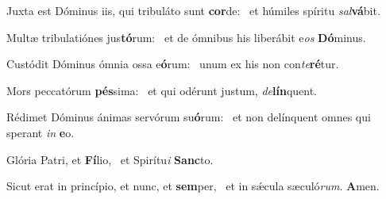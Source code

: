 \item Juxta est Dóminus iis, qui tribuláto sunt \textbf{cor}de:~\psstar{} et húmiles spíritu \textit{sal}\textbf{vá}bit.
\item Multæ tribulatiónes jus\textbf{tó}\-rum:~\psstar{} et de ómnibus his liberábit e\textit{os} \textbf{Dó}minus.
\item Custódit Dóminus ómnia ossa e\textbf{ó}rum:~\psstar{} unum ex his non con\textit{te}\textbf{ré}tur.
\item Mors peccatórum \textbf{pés}sima:~\psstar{} et qui odérunt justum, \textit{de}\textbf{lín}quent.
\item Rédimet Dóminus ánimas servórum su\textbf{ó}rum:~\psstar{} et non delínquent omnes qui sperant \textit{in} \textbf{e}o.
\item Glória Patri, et \textbf{Fí}lio,~\psstar{} et Spirítu\textit{i} \textbf{Sanc}to.
\item Sicut erat in princípio, et nunc, et \textbf{sem}per,~\psstar{} et in sǽcula sæculó\textit{rum}. \textbf{A}men.
